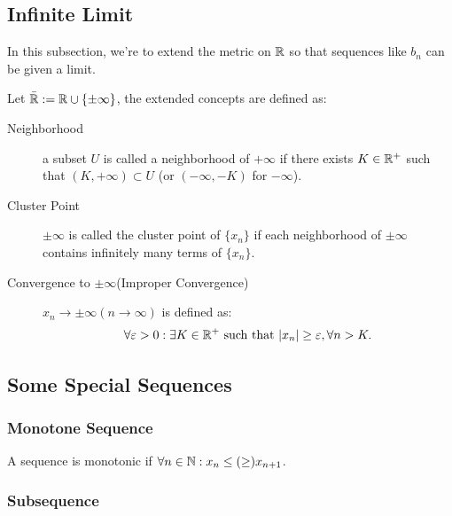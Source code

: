 \subsection{Infinite Limit}
In this subsection, we're to extend the metric on $\mathbb{R}$ so that sequences like $b_n$ can be given a limit.
\begin{definition}
    Let $\bar{\mathbb{R}} := \mathbb{R} \cup \{\pm \infty\}$, the extended concepts are defined as:
    \begin{description}
        \item[Neighborhood] a subset $U$ is called a neighborhood of $+ \infty$ if there exists $K\in \mathbb{R}^+$ such that $(K,+\infty) \subset U$ (or $(-\infty,-K)$ for $-\infty$). 
        \item[Cluster Point] $\pm \infty$ is called the cluster point of $\{x_n\}$ if each neighborhood of $\pm \infty$ contains infinitely many terms of $\{x_n\}$.
        \item[Convergence to $\pm \infty$(Improper Convergence)] $x_n\to \pm \infty (n\to \infty)$ is defined as: $$\forall \varepsilon>0 : \exists K\in \mathbb{R}^+ \text{ such that } |x_n|\geq \varepsilon, \forall n >K.$$
    \end{description} 
\end{definition}

\subsection{Some Special Sequences}
\subsubsection{Monotone Sequence}
A sequence is monotonic if $\forall n \in \mathbb{N} : x_n \leq(\geq) x_{n+1}$. 
\begin{theorem}
    
\end{theorem}

\begin{theorem}[Stolze]
    
\end{theorem}

\subsubsection{Subsequence}
\begin{theorem}
    
\end{theorem}

